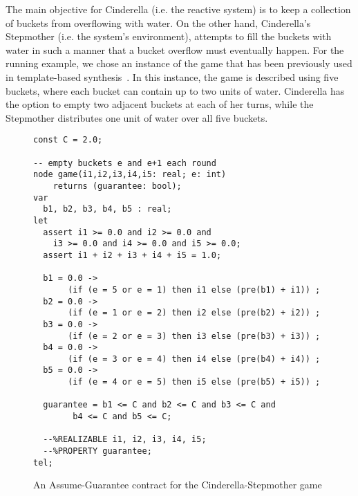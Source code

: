 The main objective for Cinderella (i.e. the reactive system) is to keep a
collection of buckets from overflowing with water. On the other hand,
Cinderella's Stepmother (i.e. the system's environment), attempts to fill the
buckets with water in such a manner that a bucket overflow must eventually
happen.
For the running example, we chose an instance of the game that has been
previously used in template-based synthesis~\cite{beyene2014constraint}. In this instance, the game is described
using five buckets, where each bucket can contain up to two units of water.
Cinderella has the option to empty two adjacent buckets at each of her turns,
while the Stepmother distributes one unit of water over all five buckets.

\begin{figure}[!t]
\centering
 \begin{Verbatim}[fontsize=\scriptsize]
const C = 2.0;

-- empty buckets e and e+1 each round
node game(i1,i2,i3,i4,i5: real; e: int)
	returns (guarantee: bool);
var
  b1, b2, b3, b4, b5 : real;
let
  assert i1 >= 0.0 and i2 >= 0.0 and 
 	i3 >= 0.0 and i4 >= 0.0 and i5 >= 0.0;
  assert i1 + i2 + i3 + i4 + i5 = 1.0;

  b1 = 0.0 -> 
       (if (e = 5 or e = 1) then i1 else (pre(b1) + i1)) ;
  b2 = 0.0 -> 
       (if (e = 1 or e = 2) then i2 else (pre(b2) + i2)) ;
  b3 = 0.0 -> 
       (if (e = 2 or e = 3) then i3 else (pre(b3) + i3)) ;
  b4 = 0.0 -> 
       (if (e = 3 or e = 4) then i4 else (pre(b4) + i4)) ;
  b5 = 0.0 -> 
       (if (e = 4 or e = 5) then i5 else (pre(b5) + i5)) ;

  guarantee = b1 <= C and b2 <= C and b3 <= C and 
  	    b4 <= C and b5 <= C;

  --%REALIZABLE i1, i2, i3, i4, i5;
  --%PROPERTY guarantee;
tel;
 \end{Verbatim}
\caption{An Assume-Guarantee contract for the Cinderella-Stepmother game}
\label{fg:cind}
\end{figure}

